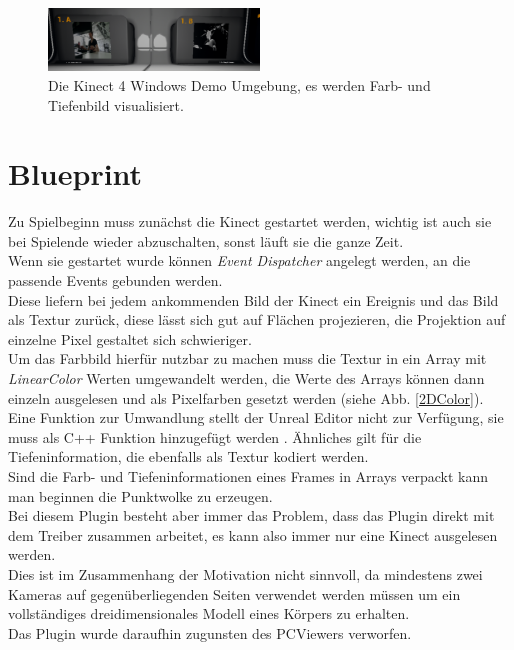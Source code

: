 \documentclass[a4paper]{IEEEtran}
\begin{document}
	\begin{figure}[!h]
    	\centering
		\includegraphics[width=0.5\textwidth]{img/Kinect4Windows}
	    \caption{Die Kinect 4 Windows Demo Umgebung, es werden Farb- und Tiefenbild visualisiert.}
    	\label{Kinect4Windows}
	\end{figure}

\section{Blueprint}
	Zu Spielbeginn muss zunächst die Kinect gestartet werden, wichtig ist auch sie bei Spielende wieder abzuschalten, sonst läuft sie die ganze Zeit. \\
	Wenn sie gestartet wurde können {\textit{Event Dispatcher}} angelegt werden, an die passende Events gebunden werden. \\
	Diese liefern bei jedem ankommenden Bild der Kinect ein Ereignis und das Bild als Textur zurück, diese lässt sich gut auf Flächen projezieren, die Projektion auf einzelne Pixel gestaltet sich schwieriger. \\
	Um das Farbbild hierfür nutzbar zu machen muss die Textur in ein Array mit {\textit{LinearColor}} Werten umgewandelt werden, die Werte des Arrays können dann einzeln ausgelesen und als Pixelfarben gesetzt werden (siehe Abb. \ref{2DColor}). \\
	Eine Funktion zur Umwandlung stellt der Unreal Editor nicht zur Verfügung, sie muss als C++ Funktion hinzugefügt werden . Ähnliches gilt für die Tiefeninformation, die ebenfalls als Textur kodiert werden. \\
	Sind die Farb- und Tiefeninformationen eines Frames in Arrays verpackt kann man beginnen die Punktwolke zu erzeugen.\\
	Bei diesem Plugin besteht aber immer das Problem, dass das Plugin direkt mit dem Treiber zusammen arbeitet, es kann also immer nur eine Kinect ausgelesen werden. \\
	Dies ist im Zusammenhang der Motivation nicht sinnvoll, da mindestens zwei Kameras auf gegenüberliegenden Seiten verwendet werden müssen um ein vollständiges dreidimensionales Modell eines Körpers zu erhalten.\\
	Das Plugin wurde daraufhin zugunsten des PCViewers verworfen.\\
\end{document}
